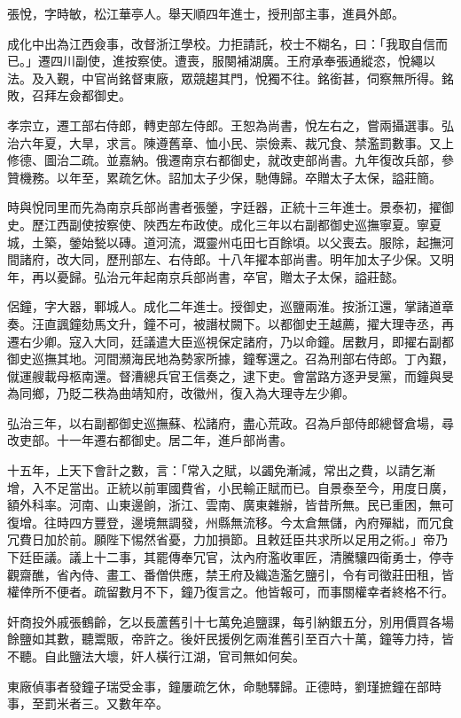 \begin{pinyinscope}
張悅，字時敏，松江華亭人。舉天順四年進士，授刑部主事，進員外郎。

成化中出為江西僉事，改督浙江學校。力拒請託，校士不糊名，曰：「我取自信而已。」遷四川副使，進按察使。遭喪，服闋補湖廣。王府承奉張通縱恣，悅繩以法。及入覲，中官尚銘督東廠，眾競趨其門，悅獨不往。銘銜甚，伺察無所得。銘敗，召拜左僉都御史。

孝宗立，遷工部右侍郎，轉吏部左侍郎。王恕為尚書，悅左右之，嘗兩攝選事。弘治六年夏，大旱，求言。陳遵舊章、恤小民、崇儉素、裁冗食、禁濫罰數事。又上修德、圖治二疏。並嘉納。俄遷南京右都御史，就改吏部尚書。九年復改兵部，參贊機務。以年至，累疏乞休。詔加太子少保，馳傳歸。卒贈太子太保，謚莊簡。

時與悅同里而先為南京兵部尚書者張鎣，字廷器，正統十三年進士。景泰初，擢御史。歷江西副使按察使、陜西左布政使。成化三年以右副都御史巡撫寧夏。寧夏城，土築，鎣始甃以磚。道河流，溉靈州屯田七百餘頃。以父喪去。服除，起撫河間諸府，改大同，歷刑部左、右侍郎。十八年擢本部尚書。明年加太子少保。又明年，再以憂歸。弘治元年起南京兵部尚書，卒官，贈太子太保，謚莊懿。

侶鐘，字大器，鄆城人。成化二年進士。授御史，巡鹽兩淮。按浙江還，掌諸道章奏。汪直諷鐘劾馬文升，鐘不可，被譖杖闕下。以都御史王越薦，擢大理寺丞，再遷右少卿。寇入大同，廷議遣大臣巡視保定諸府，乃以命鐘。居數月，即擢右副都御史巡撫其地。河間瀕海民地為勢家所據，鐘奪還之。召為刑部右侍郎。丁內艱，僦運艘載母柩南還。督漕總兵官王信奏之，逮下吏。會當路方逐尹旻黨，而鐘與旻為同鄉，乃貶二秩為曲靖知府，改徽州，復入為大理寺左少卿。

弘治三年，以右副都御史巡撫蘇、松諸府，盡心荒政。召為戶部侍郎總督倉場，尋改吏部。十一年遷右都御史。居二年，進戶部尚書。

十五年，上天下會計之數，言：「常入之賦，以蠲免漸減，常出之費，以請乞漸增，入不足當出。正統以前軍國費省，小民輸正賦而已。自景泰至今，用度日廣，額外科率。河南、山東邊餉，浙江、雲南、廣東雜辦，皆昔所無。民已重困，無可復增。往時四方豐登，邊境無調發，州縣無流移。今太倉無儲，內府殫絀，而冗食冗費日加於前。願陛下惕然省憂，力加損節。且敕廷臣共求所以足用之術。」帝乃下廷臣議。議上十二事，其罷傳奉冗官，汰內府濫收軍匠，清騰驤四衛勇士，停寺觀齋醮，省內侍、畫工、番僧供應，禁王府及織造濫乞鹽引，令有司徵莊田租，皆權倖所不便者。疏留數月不下，鐘乃復言之。他皆報可，而事關權幸者終格不行。

奸商投外戚張鶴齡，乞以長蘆舊引十七萬免追鹽課，每引納銀五分，別用價買各場餘鹽如其數，聽鬻販，帝許之。後奸民援例乞兩淮舊引至百六十萬，鐘等力持，皆不聽。自此鹽法大壞，奸人橫行江湖，官司無如何矣。

東廠偵事者發鐘子瑞受金事，鐘屢疏乞休，命馳驛歸。正德時，劉瑾摭鐘在部時事，至罰米者三。又數年卒。


\end{pinyinscope}
